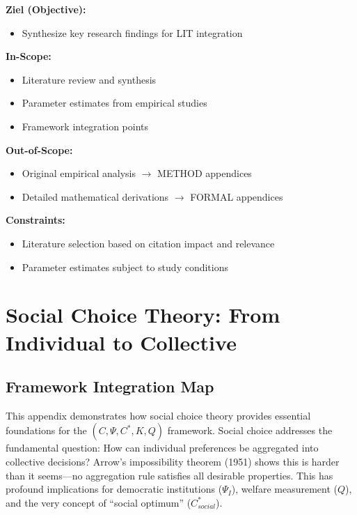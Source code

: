 \begin{tcolorbox}[
    colback=orange!5!white,
    colframe=orange!75!black,
    title={\textbf{Appendix Scope: Ziel / In-Scope / Out-of-Scope / Constraints}},
    fonttitle=\bfseries
]

\textbf{Ziel (Objective):}
\begin{itemize}[nosep]
    \item Synthesize key research findings for LIT integration
\end{itemize}

\textbf{In-Scope:}
\begin{itemize}[nosep]
    \item Literature review and synthesis
    \item Parameter estimates from empirical studies
    \item Framework integration points
\end{itemize}

\textbf{Out-of-Scope:}
\begin{itemize}[nosep]
    \item Original empirical analysis $\rightarrow$ METHOD appendices
    \item Detailed mathematical derivations $\rightarrow$ FORMAL appendices
\end{itemize}

\textbf{Constraints:}
\begin{itemize}[nosep]
    \item Literature selection based on citation impact and relevance
    \item Parameter estimates subject to study conditions
\end{itemize}

\end{tcolorbox}

\section{Social Choice Theory: From Individual to Collective}
\label{app:social-choice}

\subsection{Framework Integration Map}

This appendix demonstrates how social choice theory provides essential 
foundations for the $(C, \Psi, C^*, K, Q)$ framework. Social choice addresses 
the fundamental question: How can individual preferences be aggregated into 
collective decisions? Arrow's impossibility theorem (1951) shows this is 
harder than it seems---no aggregation rule satisfies all desirable properties. 
This has profound implications for democratic institutions ($\Psi_I$), welfare 
measurement ($Q$), and the very concept of ``social optimum'' ($C^*_{social}$).

